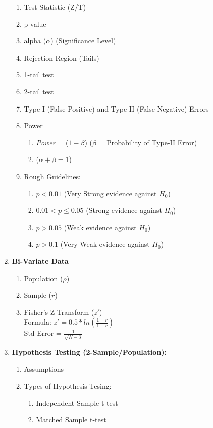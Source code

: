 \documentclass[11pt]{article}
\begin{document}
\begin{enumerate}
\begin{enumerate}
			\item Test Statistic (Z/T)
			\item p-value 
			\item alpha ($\alpha$) (Significance Level)
			\item Rejection Region (Tails)
			\item 1-tail test
			\item 2-tail test
			\item Type-I (False Positive) and Type-II (False Negative) Errors
			\item Power
			\begin{enumerate}
				\item \textit{Power} = ($1 - \beta$) ($\beta$ = Probability of Type-II Error)
				\item ($\alpha + \beta = 1$) 
			\end{enumerate}
			\item Rough Guidelines:
			\begin{enumerate}
				\item $p < 0.01$ (Very Strong evidence against $H_0$)
				\item $0.01 < p \leq 0.05$ (Strong evidence against $H_0$)
				\item $p > 0.05$ (Weak evidence against $H_0$)
				\item $p > 0.1$ (Very Weak evidence against $H_0$)
			\end{enumerate}
		\end{enumerate} 
		\item \textbf{Bi-Variate Data}
		\begin{enumerate}
			\item Population ($\rho$)
			\item Sample ($r$)
			\item Fisher's Z Transform ($z'$) \\
			Formula:
			$z' = 0.5 * ln(\frac{1 + r}{1 - r})  $ \\
			Std Error = $\frac{1}{\sqrt{N - 3}}$
		\end{enumerate}
		\item \textbf{Hypothesis Testing (2-Sample/Population):}
		\begin{enumerate}
			\item Assumptions
			\item Types of Hypothesis Tesing:
			\begin{enumerate}
				\item Independent Sample t-test
				\item Matched Sample t-test

\end{enumerate}
\end{enumerate}
\end{enumerate}
\end{document}
